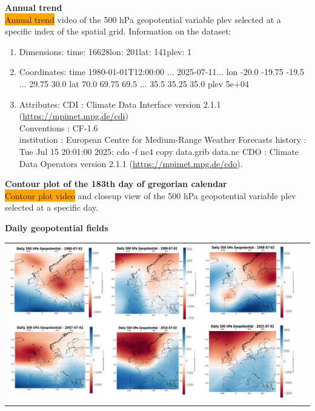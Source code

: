 \documentclass[9pt]{beamer}
\begin{document}
\begin{frame}[allowframebreaks]{\textbf{Annual trend}}
\centering
{}\\
\colorbox{orange}{Annual trend} video of the 500 hPa geopotential variable plev selected at a specific index of the spatial grid. Information on the dataset:
\begin{enumerate}
\item Dimensions:     time: 16628lon: 201lat: 141plev: 1
\item Coordinates:
    time     1980-01-01T12:00:00 ... 2025-07-11...
    lon   -20.0 -19.75 -19.5 ... 29.75 30.0
    lat    70.0 69.75 69.5 ... 35.5 35.25 35.0
    plev    5e+04
\item Attributes:
CDI :
    Climate Data Interface version 2.1.1 (\url{https://mpimet.mpg.de/cdi})\\
Conventions :     CF-1.6\\
institution :     European Centre for Medium-Range Weather Forecasts
history :     Tue Jul 15 20:01:00 2025: cdo -f nc4 copy data.grib data.nc
CDO :     Climate Data Operators version 2.1.1 (\url{https://mpimet.mpg.de/cdo}).
\end{enumerate} 
\end{frame}

\begin{frame}[allowframebreaks]{\textbf{Contour plot of the 183th day of gregorian calendar}}
\centering
{}\\
\colorbox{orange}{Contour plot video} and closeup view of the 500 hPa geopotential variable plev selected at a specific day.
\end{frame}

\begin{frame}[allowframebreaks]{\textbf{Daily geopotential fields}}
\begin{table}
    \centering
    \begin{tabular}{cc}
        \includegraphics[height=0.55\textwidth]{figures/anys/dailys.png} \\ 
    \end{tabular}
    \label{fig:3}
\end{table}
\end{frame}
\end{document}
